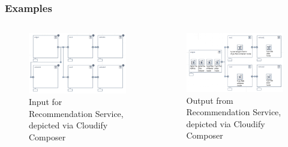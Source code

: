 \documentclass{beamer}
\begin{document}
	\begin{frame}
		\frametitle{Examples}
			
			\begin{columns}[t]
				\begin{column}{.5\textwidth}
					\begin{figure}[h]	
						\centering
						\includegraphics[width=1\textwidth]{figures/tosca_input.png}
						\caption{Input for Recommendation Service, depicted via Cloudify Composer \protect\footnotemark}
						\label{fig:recommendation_example_input}
					\end{figure}
				\end{column}
			
				\begin{column}{.5\textwidth}
					\begin{figure}[h]	
						\centering
						\includegraphics[width=1\textwidth]{figures/tosca_output.png}
						\caption{Output from Recommendation Service, depicted via Cloudify Composer}
						\label{fig:recommendation_example_output}
					\end{figure}
				\end{column}
				
			\end{columns}
		
	
	\end{frame}
	
\end{document}
